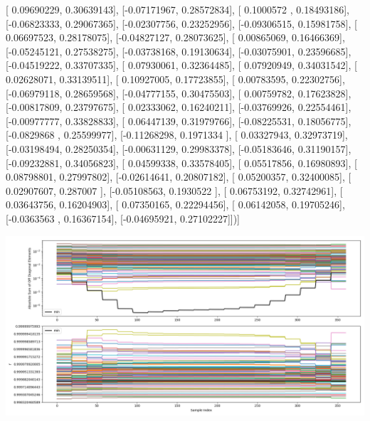 \documentclass{article}
\begin{document}
       [ 0.09690229,  0.30639143],
       [-0.07171967,  0.28572834],
       [ 0.1000572 ,  0.18493186],
       [-0.06823333,  0.29067365],
       [-0.02307756,  0.23252956],
       [-0.09306515,  0.15981758],
       [ 0.06697523,  0.28178075],
       [-0.04827127,  0.28073625],
       [ 0.00865069,  0.16466369],
       [-0.05245121,  0.27538275],
       [-0.03738168,  0.19130634],
       [-0.03075901,  0.23596685],
       [-0.04519222,  0.33707335],
       [ 0.07930061,  0.32364485],
       [ 0.07920949,  0.34031542],
       [ 0.02628071,  0.33139511],
       [ 0.10927005,  0.17723855],
       [ 0.00783595,  0.22302756],
       [-0.06979118,  0.28659568],
       [-0.04777155,  0.30475503],
       [ 0.00759782,  0.17623828],
       [-0.00817809,  0.23797675],
       [ 0.02333062,  0.16240211],
       [-0.03769926,  0.22554461],
       [-0.00977777,  0.33828833],
       [ 0.06447139,  0.31979766],
       [-0.08225531,  0.18056775],
       [-0.0829868 ,  0.25599977],
       [-0.11268298,  0.1971334 ],
       [ 0.03327943,  0.32973719],
       [-0.03198494,  0.28250354],
       [-0.00631129,  0.29983378],
       [-0.05183646,  0.31190157],
       [-0.09232881,  0.34056823],
       [ 0.04599338,  0.33578405],
       [ 0.05517856,  0.16980893],
       [ 0.08798801,  0.27997802],
       [-0.02614641,  0.20807182],
       [ 0.05200357,  0.32400085],
       [ 0.02907607,  0.287007  ],
       [-0.05108563,  0.1930522 ],
       [ 0.06753192,  0.32742961],
       [ 0.03643756,  0.16204903],
       [ 0.07350165,  0.22294456],
       [ 0.06142058,  0.19705246],
       [-0.0363563 ,  0.16367154],
       [-0.04695921,  0.27102227]])]
\begin{center}
\includegraphics[scale=.9]{report_pickled_controls240/control_dpn_all.png}

\end{center}
\end{document}
